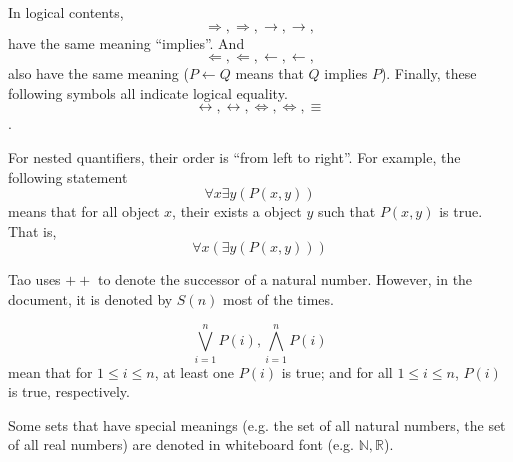 In logical contents, 
\[
\Longrightarrow, \Rightarrow, \longrightarrow, \rightarrow, 
\]
have the same meaning ``implies''. And 
\[
\Longleftarrow, \Leftarrow, \longleftarrow, \leftarrow,
\]
also have the same meaning ($P \leftarrow Q$ means that $Q$ implies $P$).
Finally, these following symbols all indicate logical equality.
\[
\leftrightarrow, \longleftrightarrow, \Leftrightarrow, \Longleftrightarrow, \equiv
\].

For nested quantifiers, their order is ``from left to right''. For example, the following statement 
\[
\forall x \exists y (P(x,y))
\]
means that for all object $x$, their exists a object $y$ such that $P(x,y)$ is true.
That is,
\[
\forall x(\exists y(P(x,y)))
\]

Tao uses $++$ to denote the successor of a natural number. However, in the document, it is denoted by 
$S(n)$ most of the times.

\[
\bigvee_{i=1}^{n} P(i), \bigwedge_{i=1}^{n} P(i)
\]
mean that for $1\leq i \leq n$, at least one $P(i)$ is true; and for all $1\leq i \leq n$, $P(i)$ is 
true, respectively.

Some sets that have special meanings (e.g. the set of all natural numbers, the set of all real numbers) 
are denoted in whiteboard font (e.g. $\mathbb{N}, \mathbb{R}$).